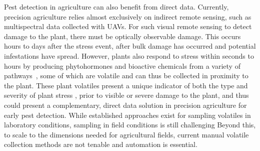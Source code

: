 Pest detection in agriculture can also benefit from direct data. Currently, precision agriculture relies almost exclusively on indirect remote sensing, such as multispectral data collected with UAVs.
For such visual remote sensing to detect damage to the plant, there must be optically observable damage. This occurs hours to days after the stress event, after bulk damage has occurred and potential infestations have spread. However, plants also respond to stress within seconds to hours by producing phytohormones and bioactive chemicals from a variety of pathways~\cite{schuman_layers_2016}, some of which are volatile and can thus be collected in proximity to the plant. These plant volatiles present a unique indicator of both the type and severity of plant stress \cite{howe_plant_2008, dicke_evolutionary_2010}, prior to visible or severe damage to the plant, and thus could present a complementary, direct data solution in precision agriculture for early pest detection. While established approaches exist for sampling volatiles in laboratory conditions, sampling in field conditions is still challenging \cite{} %
Beyond this, to scale to the dimensions needed for agricultural fields, current manual volatile collection methods are not tenable and automation is essential. 


